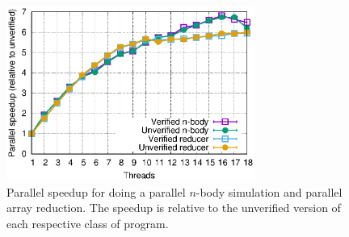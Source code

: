 \begin{figure}
\captionsetup{justification=centering}
  \begin{center}
    \includegraphics[width=3.2in]{text/refinementreflection/nbody.eps}
  \end{center}
  \caption[Parallel speedup for $n$-body simulation and array reduction.]
      {Parallel speedup for doing a parallel $n$-body simulation and
      parallel array reduction. The speedup is relative to the
    unverified version of each respective class of program.}
  \label{fig:nbody}
\end{figure}


